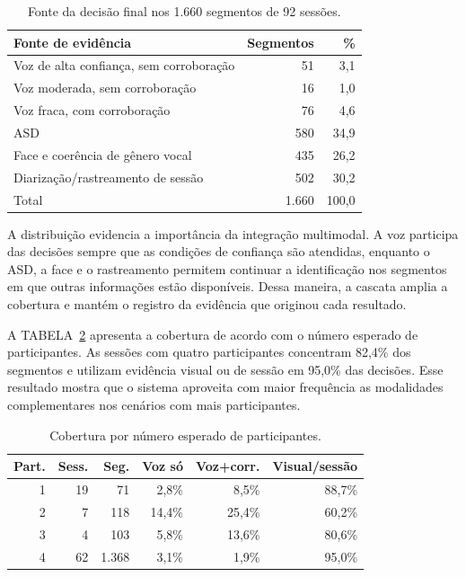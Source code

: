 \documentclass[a4paper,11pt]{article}
\begin{document}
\begin{table}[H]
    \centering
    \caption{Fonte da decisão final nos 1.660 segmentos de 92 sessões.}
    \label{tab:decisoes}
    \footnotesize
    \begin{tabular}{lrr}
        \hline
        \textbf{Fonte de evidência} & \textbf{Segmentos} & \textbf{\%} \\
        \hline
        Voz de alta confiança, sem corroboração & 51  & 3,1 \\
        Voz moderada, sem corroboração          & 16  & 1,0 \\
        Voz fraca, com corroboração             & 76  & 4,6 \\
        ASD                                     & 580 & 34,9 \\
        Face e coerência de gênero vocal        & 435 & 26,2 \\
        Diarização/rastreamento de sessão       & 502 & 30,2 \\
        \hline
        Total                                   & 1.660 & 100,0 \\
        \hline
    \end{tabular}
\end{table}

A distribuição evidencia a importância da integração multimodal. A voz participa das decisões sempre que as condições de confiança são atendidas, enquanto o ASD, a face e o rastreamento permitem continuar a identificação nos segmentos em que outras informações estão disponíveis. Dessa maneira, a cascata amplia a cobertura e mantém o registro da evidência que originou cada resultado.

A TABELA~\ref{tab:grupos} apresenta a cobertura de acordo com o número esperado de participantes. As sessões com quatro participantes concentram 82,4\% dos segmentos e utilizam evidência visual ou de sessão em 95,0\% das decisões. Esse resultado mostra que o sistema aproveita com maior frequência as modalidades complementares nos cenários com mais participantes.

\begin{table}[H]
    \centering
    \caption{Cobertura por número esperado de participantes.}
    \label{tab:grupos}
    \footnotesize
    \begin{tabular}{rrrrrr}
        \hline
        \textbf{Part.} & \textbf{Sess.} & \textbf{Seg.} & \textbf{Voz só} & \textbf{Voz+corr.} & \textbf{Visual/sessão} \\
        \hline
        1 & 19 & 71    & 2,8\%  & 8,5\%  & 88,7\% \\
        2 & 7  & 118   & 14,4\% & 25,4\% & 60,2\% \\
        3 & 4  & 103   & 5,8\%  & 13,6\% & 80,6\% \\
        4 & 62 & 1.368 & 3,1\%  & 1,9\%  & 95,0\% \\
        \hline
    \end{tabular}
\end{table}
\end{document}
